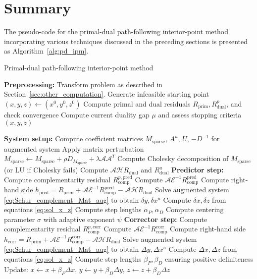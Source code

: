 \section{Summary}
The pseudo-code for the primal-dual path-following interior-point method incorporating various techniques discussed in the preceding sections is presented as Algorithm~\ref{alg:pd_ipm}. 
\begin{algorithm}
\caption{Primal-dual path-following interior-point method}
\label{alg:pd_ipm}
\begin{algorithmic}[1]
\STATE \textbf{Preprocessing:} Transform problem as described in Section~\ref{sec:other_computation}. 
Generate infeasible starting point $(x,y,z) \leftarrow (x^0, y^0, z^0)$
    \STATE Compute primal and dual residuals $R_{\text{prim}}, R_{\text{dual}}^p$, and check convergence
    \STATE Compute current duality gap $\mu$ and assess stopping criteria
        \RETURN $(x, y, z)$
    \ENDIF
    
    \STATE \textbf{System setup:}
    \STATE Compute coefficient matrices $M_{\text{sparse}}$, $A^u$, $U$, $-D^{-1}$ for augmented system
    \STATE Apply matrix perturbation $M_{\text{sparse}} \leftarrow M_{\text{sparse}} + \rho D_{M_{\text{sparse}}} + \lambda \mathcal{A}\mathcal{A}^T$
    \STATE Compute Cholesky decomposition of $M_{\text{sparse}}$ (or LU if Cholesky fails)
    \STATE Compute $\mathcal{A}\mathcal{H}R_{\text{dual}}$ and $R^u_{\text{dual}}$
    \STATE 
    \STATE \textbf{Predictor step:}
    \STATE Compute complementarity residual $R_{\text{comp}}^{p,\text{pred}}$
    \STATE Compute $\mathcal{A}\mathcal{E}^{-1}R_{\text{comp}}^{\text{pred}}$ 
    \STATE Compute right-hand side $h_{\text{pred}} = R_{\text{prim}} + \mathcal{A}\mathcal{E}^{-1}R_{\text{comp}}^{\text{pred}} - \mathcal{A}\mathcal{H}R_{\text{dual}}$
    \STATE Solve augmented system \eqref{eq:Schur_complement_Mat_aug} to obtain $\delta y, \delta x^u$
    \STATE Compute $\delta x, \delta z$ from equations \eqref{eq:sol_x_z}
    \STATE Compute step lengths $\alpha_{P}, \alpha_{D}$
    \STATE Compute centering parameter $\sigma$ with adaptive exponent $\psi$
    \STATE
    \STATE \textbf{Corrector step:}
    \STATE Compute complementarity residual $R_{\text{comp}}^{p,\text{corr}}$
    \STATE Compute $\mathcal{A}\mathcal{E}^{-1}R_{\text{comp}}^{\text{corr}}$
    \STATE Compute right-hand side $h_{\text{corr}} = R_{\text{prim}} + \mathcal{A}\mathcal{E}^{-1}R_{\text{comp}}^{\text{corr}} - \mathcal{A}\mathcal{H}R_{\text{dual}}$
    \STATE Solve augmented system \eqref{eq:Schur_complement_Mat_aug} to obtain $\Delta y, \Delta x^u$
    \STATE Compute $\Delta x, \Delta z$ from equations \eqref{eq:sol_x_z}
    \STATE Compute step lengths $\beta_P, \beta_D$ ensuring positive definiteness
    \STATE Update: $x \leftarrow x + \beta_P \Delta x$, $y \leftarrow y + \beta_D \Delta y$, $z \leftarrow z + \beta_D \Delta z$


\end{algorithmic}
\end{algorithm}
